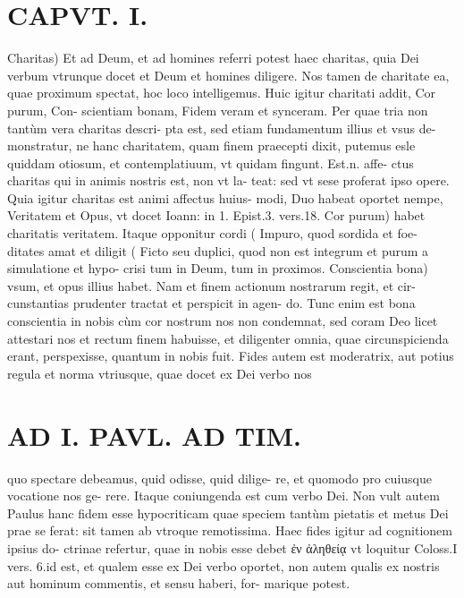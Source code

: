 \documentclass{article}
\begin{document}
\begin{pages}
\section*{CAPVT. I. }
\marginpar{[ p.15 ]}\pstart Charitas) Et ad Deum, et ad homines referri potest haec charitas, quia Dei verbum vtrunque docet et Deum et homines diligere. Nos tamen de charitate ea, quae proximum spectat, hoc loco intelligemus.  \pend\pstart Huic igitur charitati addit, Cor purum, Con- scientiam bonam, Fidem veram et synceram. Per quae tria non tantùm vera charitas descri- pta est, sed etiam fundamentum illius et vsus de- monstratur, ne hanc charitatem, quam finem praecepti dixit, putemus esle quiddam otiosum, et contemplatiuum, vt quidam fingunt. Est.n. affe- ctus charitas qui in animis nostris est, non vt la- teat: sed vt sese proferat ipso opere.  \pend\pstart Quia igitur charitas est animi affectus huius- modi, Duo habeat oportet nempe, Veritatem et Opus, vt docet Ioann: in 1. Epist.3. vers.18. Cor purum) habet charitatis veritatem. Itaque opponitur cordi ( Impuro, quod sordida et foe- ditates amat et diligit ( Ficto seu duplici, quod non est integrum et purum a simulatione et hypo- crisi tum in Deum, tum in proximos.  \pend\pstart Conscientia bona) vsum, et opus illius habet. Nam et finem actionum nostrarum regit, et cir- cunstantias prudenter tractat et perspicit in agen- do. Tunc enim est bona conscientia in nobis cùm cor nostrum nos non condemnat, sed coram Deo licet attestari nos et rectum finem habuisse, et diligenter omnia, quae circunspicienda erant, perspexisse, quantum in nobis fuit.  \pend\pstart Fides autem est moderatrix, aut potius regula et norma vtriusque, quae docet ex Dei verbo nos  \pend
\section*{AD I. PAVL. AD TIM. }
\marginpar{[ p.16 ]}\pstart quo spectare debeamus, quid odisse, quid dilige- re, et quomodo pro cuiusque vocatione nos ge- rere. Itaque coniungenda est cum verbo Dei. Non vult autem Paulus hanc fidem esse hypocriticam quae speciem tantùm pietatis et metus Dei prae se ferat: sit tamen ab vtroque remotissima.  \pend\pstart Haec fides igitur ad cognitionem ipsius do- ctrinae refertur, quae in nobis esse debet ἐν ἀληθείᾳ vt loquitur Coloss.I vers. 6.id est, et qualem esse ex Dei verbo oportet, non autem qualis ex nostris aut hominum commentis, et sensu haberi, for- marique potest.  \pend
{}
{}

\end{pages}
\end{document}
